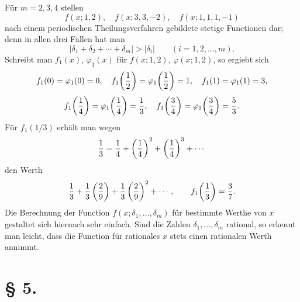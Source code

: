 \documentclass[11pt,a4paper]{article}
\begin{document}
Für $m=2,3,4$ stellen
\[
 f(x;1,2),\quad f(x;3,3,-2),\quad f(x;1,1,1,-1)
\]
nach einem periodischen Theilungsverfahren gebildete stetige Functionen dar; denn in allen drei Fällen hat man
\[
 |\delta_1+\delta_2+\cdots+\delta_m|>|\delta_i|
 \qquad (i=1,2,\ldots,m).
\]
Schreibt man $f_1(x)$, $\varphi_1(x)$ für $f(x;1,2)$, $\varphi(x;1,2)$, so ergiebt sich
\[
 f_1(0)=\varphi_1(0)=0,
 \quad
 f_1\!\left({1\over2}\right)=\varphi_1\!\left({1\over2}\right)=1,
 \quad
 f_1(1)=\varphi_1(1)=3,
\]
\[
 f_1\!\left({1\over4}\right)=\varphi_1\!\left({1\over4}\right)={1\over3},
 \quad
 f_1\!\left({3\over4}\right)=\varphi_1\!\left({3\over4}\right)={5\over3}.
\]
Für $f_1(1/3)$ erhält man wegen
\[
 {1\over3}={1\over4}+\left({1\over4}\right)^2+\left({1\over4}\right)^3+\cdots
\]
den Werth
\[
 {1\over3}+{1\over3}\left({2\over9}\right)+{1\over3}\left({2\over9}\right)^2+\cdots,
 \qquad
 f_1\!\left({1\over3}\right)={3\over7}.
\]
Die Berechnung der Function $f(x;\delta_1,\ldots,\delta_m)$ für bestimmte Werthe von $x$ gestaltet sich hiernach sehr einfach. Sind die Zahlen $\delta_1,\ldots,\delta_m$ rational, so erkennt man leicht, dass die Function für rationales $x$ stets einen rationalen Werth annimmt.

\section*{§ 5.}
\end{document}
